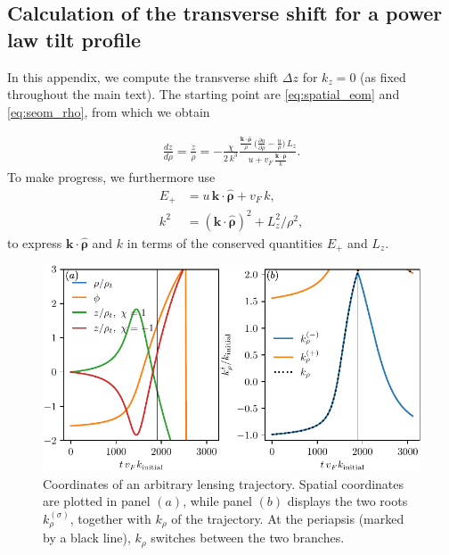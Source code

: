 \documentclass[submission, Phys]{SciPost}
\begin{document}
\begin{appendix}
\section{Calculation of the transverse shift for a power law tilt profile}
\label{Sec:append_TranShift}
In this appendix, we compute the transverse shift $\Delta z$ for $k_z=0$ (as fixed throughout the main text). The starting point are \cref{eq:spatial_eom} and \cref{eq:seom_rho}, from which we obtain

\begin{align}
    \frac{dz}{d\rho} = \frac{\dot{z}}{\dot{\rho}}=-\frac{\chi}{2\,k^3}\frac{\frac{\bm k \cdot \hat{\bm \rho}}{\rho}\, \bigg( \frac{\partial u}{\partial \rho}-\frac{u}{\rho}\bigg)\,L_z}{u+v_F\,\frac{\bm k \cdot \hat{\bm \rho}}{k}}.
\end{align}
To make progress, we furthermore use
\begin{align}
    E_+ & = u\,\bm k \cdot \hat{\bm \rho} + v_F \,k, \\
    k^2 & = ( \bm k \cdot \hat{\bm \rho} )^2 + L_z^2 / \rho^2,
\end{align}
to express $\bm k \cdot \hat{\bm \rho}$ and $k$ in terms of the conserved quantities $E_+$ and $L_z$.
\begin{figure}[ht]
    \centering
    \includegraphics[width=\textwidth]{fig/lensing_cylinder.pdf}
    \caption{Coordinates of an arbitrary lensing trajectory. Spatial coordinates are plotted in panel $(a)$, while panel $(b)$ displays the two roots $k_\rho^{(\sigma)}$, together with $k_\rho$ of the trajectory. At the periapsis (marked by a black line), $k_\rho$ switches between the two branches.}
    \label{fig:lensing_example}
\end{figure}


\end{appendix}
\end{document}
